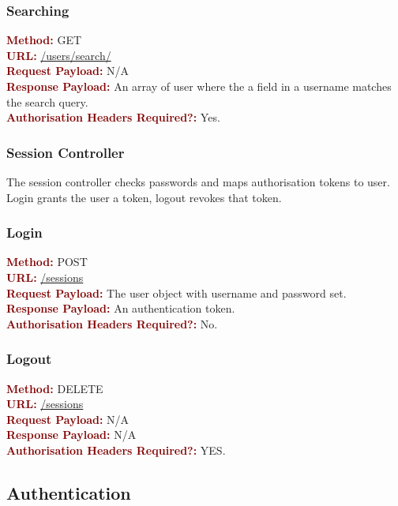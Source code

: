 \documentclass[11pt,a4paper]{report}
\begin{document}
\subsubsection{Searching}
\textbf{\textcolor{Maroon}{Method:}} GET\\
\textbf{\textcolor{Maroon}{URL:}} \url{/users/search/}\\
\textbf{\textcolor{Maroon}{Request Payload:}} N/A\\
\textbf{\textcolor{Maroon}{Response Payload:}} An array of user where the a field in a username matches the search query.\\
\textbf{\textcolor{Maroon}{Authorisation Headers Required?:}} Yes.

\subsubsection{Session Controller}

The session controller checks passwords and maps authorisation tokens to user. Login grants the user a token, logout revokes that token. 

\subsubsection{Login}
\textbf{\textcolor{Maroon}{Method:}} POST\\
\textbf{\textcolor{Maroon}{URL:}} \url{/sessions}\\
\textbf{\textcolor{Maroon}{Request Payload:}} The user object with username and password set.\\
\textbf{\textcolor{Maroon}{Response Payload:}} An authentication token.\\
\textbf{\textcolor{Maroon}{Authorisation Headers Required?:}} No.

\subsubsection{Logout}
\textbf{\textcolor{Maroon}{Method:}} DELETE\\
\textbf{\textcolor{Maroon}{URL:}} \url{/sessions}\\
\textbf{\textcolor{Maroon}{Request Payload:}} N/A\\
\textbf{\textcolor{Maroon}{Response Payload:}} N/A\\
\textbf{\textcolor{Maroon}{Authorisation Headers Required?:}} YES.

\subsection{Authentication}
\end{document}
